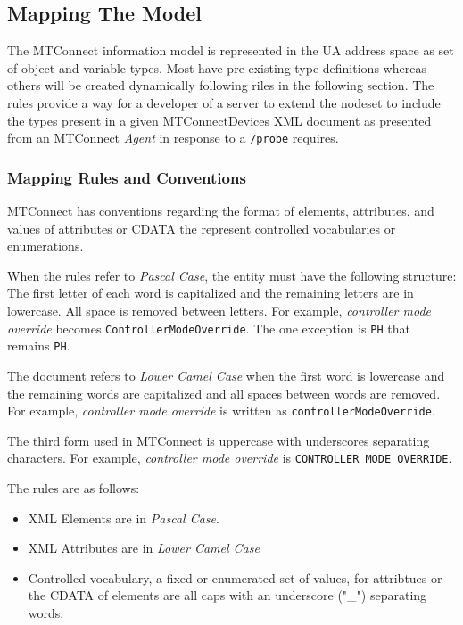 \subsection{Mapping The Model}
\lstset{language=XML,numbers=left,xleftmargin=2em}

The MTConnect information model is represented in the UA address space as set of object and variable types. Most have pre-existing type definitions whereas others will be created dynamically following riles in the following section. The rules provide a way for a developer of a server to extend the nodeset to include the types present in a given MTConnectDevices XML document as presented from an MTConnect \textit{Agent} in response to a \texttt{/probe} requires.

\subsubsection{Mapping Rules and Conventions}

MTConnect has conventions regarding the format of elements, attributes, and values of attributes or CDATA the represent controlled vocabularies or enumerations. 

When the rules refer to \textit{Pascal Case}, the entity must have the following structure: The first letter of each word is capitalized and the remaining letters are in lowercase. All space is removed between letters. For example, \textit{controller mode override} becomes \texttt{Controller\-Mode\-Override}. The one exception is \texttt{PH} that remains \texttt{PH}.

The document refers to \textit{Lower Camel Case} when the first word is lowercase and the remaining words are capitalized and all spaces between words are removed. For example, \textit{controller mode override} is written as \texttt{controllerModeOverride}.

The third form used in MTConnect is uppercase with underscores separating characters. For example, \textit{controller mode override} is \texttt{CONTROLLER_MODE_OVERRIDE}.

The rules are as follows:
\begin{itemize}
\item XML Elements are in \textit{Pascal Case}.
\item XML Attributes are in \textit{Lower Camel Case}
\item Controlled vocabulary, a fixed or enumerated set of values, for attribtues or the CDATA of elements are all caps with an underscore ("\_") separating words. 
\end{itemize}


